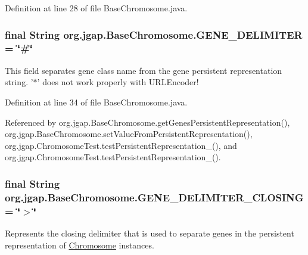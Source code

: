 Definition at line 28 of file Base\-Chromosome.\-java.

\hypertarget{classorg_1_1jgap_1_1_base_chromosome_a5cb3ac5d20e1fccb7eacdd0bb38bd650}{
\subsubsection[{G\-E\-N\-E\-\_\-\-D\-E\-L\-I\-M\-I\-T\-E\-R}]{\setlength{\rightskip}{0pt plus 5cm}final String org.\-jgap.\-Base\-Chromosome.\-G\-E\-N\-E\-\_\-\-D\-E\-L\-I\-M\-I\-T\-E\-R = \char`\"{}\#\char`\"{}\hspace{0.3cm}{\ttfamily [static]}}}\label{classorg_1_1jgap_1_1_base_chromosome_a5cb3ac5d20e1fccb7eacdd0bb38bd650}
This field separates gene class name from the gene persistent representation string. '$\ast$' does not work properly with U\-R\-L\-Encoder! 

Definition at line 34 of file Base\-Chromosome.\-java.



Referenced by org.\-jgap.\-Base\-Chromosome.\-get\-Genes\-Persistent\-Representation(), org.\-jgap.\-Base\-Chromosome.\-set\-Value\-From\-Persistent\-Representation(), org.\-jgap.\-Chromosome\-Test.\-test\-Persistent\-Representation\-\_(), and org.\-jgap.\-Chromosome\-Test.\-test\-Persistent\-Representation\-\_().

\hypertarget{classorg_1_1jgap_1_1_base_chromosome_a05f3c0c0caa0e1676345b2303c842be0}{
\subsubsection[{G\-E\-N\-E\-\_\-\-D\-E\-L\-I\-M\-I\-T\-E\-R\-\_\-\-C\-L\-O\-S\-I\-N\-G}]{\setlength{\rightskip}{0pt plus 5cm}final String org.\-jgap.\-Base\-Chromosome.\-G\-E\-N\-E\-\_\-\-D\-E\-L\-I\-M\-I\-T\-E\-R\-\_\-\-C\-L\-O\-S\-I\-N\-G = \char`\"{}$>$\char`\"{}\hspace{0.3cm}{\ttfamily [static]}}}\label{classorg_1_1jgap_1_1_base_chromosome_a05f3c0c0caa0e1676345b2303c842be0}
Represents the closing delimiter that is used to separate genes in the persistent representation of \hyperlink{classorg_1_1jgap_1_1_chromosome}{Chromosome} instances. 

